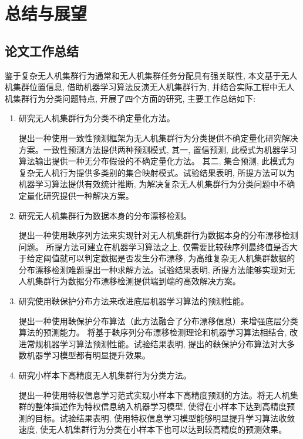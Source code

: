 \chapter{总结与展望}
\label{chapter:conclusion}

\section{论文工作总结}

鉴于复杂无人机集群行为通常和无人机集群任务分配具有强关联性, 本文基于无人机集群位置信息, 借助机器学习算法反演无人机集群行为, 并结合实际工程中无人机集群行为分类问题特点, 开展了四个方面的研究, 主要工作总结如下:

\begin{enumerate}
\item 研究无人机集群行为分类不确定量化方法。

提出一种使用一致性预测框架为无人机集群行为分类提供不确定量化研究解决方案。一致性预测方法提供两种预测模式, 其一, 置信预测, 此模式为机器学习算法输出提供一种无分布假设的不确定量化方法。 其二, 集合预测, 此模式为复杂无人机行为提供多类别的集合映射模式。试验结果表明, 所提方法可以为机器学习算法提供有效统计推断, 为解决复杂无人机集群行为分类问题中不确定量化研究提供一种解决方案。
\item 研究无人机集群行为数据本身的分布漂移检测。

提出一种使用鞅序列方法来实现针对无人机集群行为数据本身的分布漂移检测问题。 所提方法可建立在机器学习算法之上, 仅需要比较鞅序列最终值是否大于给定阈值就可以判定数据是否发生分布漂移, 为高维复杂无人机集群数据的分布漂移检测难题提出一种求解方法。试验结果表明, 所提方法能够实现对无人机集群行为数据分布漂移检测提供端到端的高效解决方案。
\item 研究使用鞅保护分布方法来改进底层机器学习算法的预测性能。

提出一种使用鞅保护分布算法（此方法融合了分布漂移信息）来增强底层分类算法的预测能力。 将基于鞅序列分布漂移检测理论和机器学习算法相结合, 改进常规机器学习算法预测性能。试验结果表明, 提出的鞅保护分布算法对大多数机器学习模型都有明显提升效果。
\item 研究小样本下高精度无人机集群行为分类方法。

提出一种使用特权信息学习范式实现小样本下高精度预测的方法。将无人机集群的整体描述作为特权信息纳入机器学习模型, 使得在小样本下达到高精度预测的目标。试验结果表明, 使用特权信息学习模型能够明显提升学习算法收敛速度, 使无人机集群行为分类在小样本下也可以达到较高精度的预测效果。
\end{enumerate}

